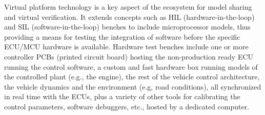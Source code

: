\small





Virtual platform technology is a key aspect of the ecosystem for model sharing and virtual verification.
It extends concepts such as HIL (hardware-in-the-loop) and SIL (software-in-the-loop) benches to include microprocessor models, thus providing a means for testing the integration of software before the specific ECU/MCU hardware is available.
Hardware test benches include one or more controller PCBs (printed circuit board) hosting the non-production ready ECU running the control software, a custom and fast hardware box running models of the controlled plant (e.g., the engine), the rest of the vehicle control architecture, the vehicle dynamics and the environment (e.g, road conditions), all synchronized in real time with the ECUs, plus a variety of other tools for calibrating the control parameters, software debuggers, etc., hosted by a dedicated computer.


